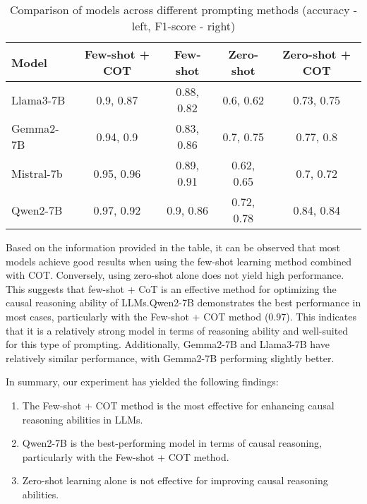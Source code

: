 \begin{table}[ht]
  \centering
  \begin{tabular}{|l|c|c|c|c|}
      \hline
      \textbf{Model}    & \textbf{Few-shot + COT} & \textbf{Few-shot} & \textbf{Zero-shot} & \textbf{Zero-shot + COT} \\ \hline

      Llama3-7B & 0.9, 0.87  & 0.88, 0.82  & 0.6, 0.62  & 0.73, 0.75  \\ \hline 

      Gemma2-7B & 0.94, 0.9 & 0.83, 0.86 & 0.7, 0.75 & 0.77, 0.8 \\ \hline 

      Mistral-7b & 0.95, 0.96 & 0.89, 0.91 & 0.62, 0.65 & 0.7, 0.72 \\ \hline

      Qwen2-7B & 0.97, 0.92 & 0.9, 0.86 & 0.72, 0.78 & 0.84, 0.84 \\ \hline

  \end{tabular}
  \caption{Comparison of models across different prompting methods (accuracy - left, F1-score - right)}
  \label{tab:model_comparison}
\end{table}


Based on the information provided in the table, it can be observed that most models achieve good results when using the few-shot learning method combined with COT. Conversely, using zero-shot alone does not yield high performance. 
This suggests that few-shot + CoT is an effective method for optimizing the causal reasoning ability of LLMs.Qwen2-7B demonstrates the best performance in most cases, particularly with the Few-shot + COT method (0.97). 
This indicates that it is a relatively strong model in terms of reasoning ability and well-suited for this type of prompting. Additionally, Gemma2-7B and Llama3-7B have relatively similar performance, with Gemma2-7B performing slightly better.

In summary, our experiment has yielded the following findings:

\begin{enumerate}
  \item The Few-shot + COT method is the most effective for enhancing causal reasoning abilities in LLMs.
  \item Qwen2-7B is the best-performing model in terms of causal reasoning, particularly with the Few-shot + COT method.
  \item Zero-shot learning alone is not effective for improving causal reasoning abilities.
\end{enumerate}


